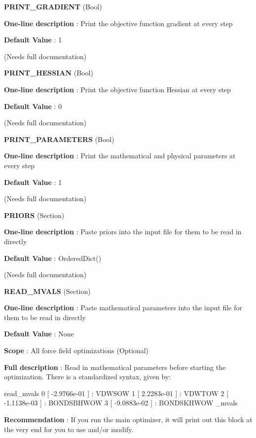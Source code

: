 \begin{DoxyItemize}
\item {\bfseries  \-P\-R\-I\-N\-T\-\_\-\-G\-R\-A\-D\-I\-E\-N\-T } (\-Bool) \par
{\bfseries  \-One-\/line description }\-: \-Print the objective function gradient at every step \par
{\bfseries  \-Default \-Value }\-: 1 \par
(\-Needs full documentation)\end{DoxyItemize}
\begin{DoxyItemize}
\item {\bfseries  \-P\-R\-I\-N\-T\-\_\-\-H\-E\-S\-S\-I\-A\-N } (\-Bool) \par
{\bfseries  \-One-\/line description }\-: \-Print the objective function \-Hessian at every step \par
{\bfseries  \-Default \-Value }\-: 0 \par
(\-Needs full documentation)\end{DoxyItemize}
\begin{DoxyItemize}
\item {\bfseries  \-P\-R\-I\-N\-T\-\_\-\-P\-A\-R\-A\-M\-E\-T\-E\-R\-S } (\-Bool) \par
{\bfseries  \-One-\/line description }\-: \-Print the mathematical and physical parameters at every step \par
{\bfseries  \-Default \-Value }\-: 1 \par
(\-Needs full documentation)\end{DoxyItemize}
\begin{DoxyItemize}
\item {\bfseries  \-P\-R\-I\-O\-R\-S } (\-Section) \par
{\bfseries  \-One-\/line description }\-: \-Paste priors into the input file for them to be read in directly \par
{\bfseries  \-Default \-Value }\-: \-Ordered\-Dict() \par
(\-Needs full documentation)\end{DoxyItemize}
\begin{DoxyItemize}
\item {\bfseries  \-R\-E\-A\-D\-\_\-\-M\-V\-A\-L\-S } (\-Section) \par
{\bfseries  \-One-\/line description }\-: \-Paste mathematical parameters into the input file for them to be read in directly \par
{\bfseries  \-Default \-Value }\-: \-None \par
{\bfseries  \-Scope }\-: \-All force field optimizations (\-Optional) \par
{\bfseries  \-Full description }\-: \-Read in mathematical parameters before starting the optimization. \-There is a standardized syntax, given by\-: \begin{DoxyVerb}read_mvals
0 [ -2.9766e-01 ] : VDWSOW
1 [  2.2283e-01 ] : VDWTOW
2 [ -1.1138e-03 ] : BONDSBHWOW
3 [ -9.0883e-02 ] : BONDSKHWOW
\read_mvals \end{DoxyVerb}
 \par
{\bfseries  \-Recommendation }\-: \-If you run the main optimizer, it will print out this block at the very end for you to use and/or modify.\end{DoxyItemize}
